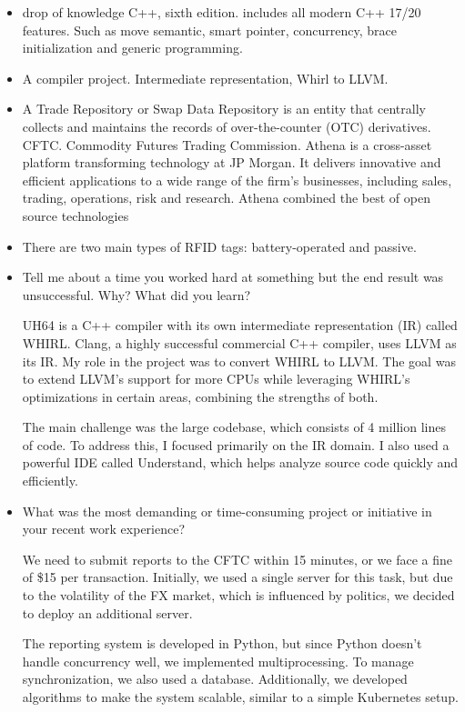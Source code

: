 \documentclass[a4paper,11pt,twoside]{book}
\begin{document}
\begin{itemize}
	\item drop of knowledge C++, sixth edition. includes all modern C++ 17/20 features. Such as move semantic,  smart pointer, concurrency, brace initialization and generic programming. 
	
	\item A compiler project. Intermediate representation, Whirl to LLVM. 
	
	\item A Trade Repository or Swap Data Repository is an entity that centrally collects and maintains the records of over-the-counter (OTC) derivatives. CFTC. Commodity Futures Trading Commission.   Athena is a cross-asset platform transforming technology at JP Morgan. It delivers innovative and efficient applications to a wide range of the firm's businesses, including sales, trading, operations, risk and research. Athena combined the best of open source technologies
	
	\item There are two main types of RFID tags: battery-operated and passive. 
	
	
	\item Tell me about a time you worked hard at something but the end result was unsuccessful. Why? What did
	you learn?
	
	UH64 is a C++ compiler with its own intermediate representation (IR) called WHIRL. Clang, a highly successful commercial C++ compiler, uses LLVM as its IR. My role in the project was to convert WHIRL to LLVM. The goal was to extend LLVM’s support for more CPUs while leveraging WHIRL’s optimizations in certain areas, combining the strengths of both.
	
	The main challenge was the large codebase, which consists of 4 million lines of code. To address this, I focused primarily on the IR domain. I also used a powerful IDE called Understand, which helps analyze source code quickly and efficiently.
	
	\item What was the most demanding or time-consuming project or initiative in your recent work experience?
	
	We need to submit reports to the CFTC within 15 minutes, or we face a fine of \$15 per transaction. Initially, we used a single server for this task, but due to the volatility of the FX market, which is influenced by politics, we decided to deploy an additional server.
	
	The reporting system is developed in Python, but since Python doesn’t handle concurrency well, we implemented multiprocessing. To manage synchronization, we also used a database. Additionally, we developed algorithms to make the system scalable, similar to a simple Kubernetes setup.
	

\end{itemize}
\end{document}
